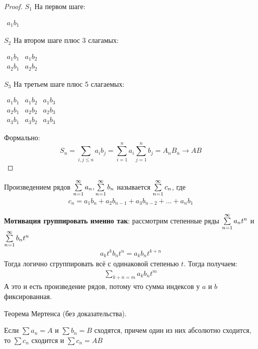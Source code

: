 \begin{proof}
    $S_1$ На первом шаге:
    \begin{center}
        $\begin{matrix}
            a_1b_1
        \end{matrix}$
    \end{center}
    $S_2$ На втором шаге плюс 3 слагамых:
    \begin{center}
        $\begin{matrix}
            a_1b_1 & a_1b_2 \\
            a_2b_1 & a_2b_2
        \end{matrix}$
    \end{center}
    $S_3$ На третьем шаге плюс 5 слагаемых:
    \begin{center}
        $\begin{matrix}
            a_1b_1 & a_1b_2 & a_1b_3 \\
            a_2b_1 & a_2b_2 & a_2b_3 \\
            a_3b_1 & a_3b_2 & a_3b_3
        \end{matrix}$
    \end{center}
    Формально:
    \begin{equation*}
        S_n = \sum_{i,j \leq n} a_ib_j = \sum_{i=1}^n a_i \sum_{j=1}^n b_j
        = A_nB_n \longrightarrow AB
    \end{equation*}

\end{proof}

\begin{conj}
    Произведением рядов $\sum \limits_{n=1}^\infty a_n, \sum \limits_{n=1}^\infty b_n$ называется $\sum \limits_{n=1}^\infty c_n$, где 
    \begin{gather*} 
        c_n = a_1b_n + a_2b_{n-1}+a_3b_{n-2} + \ldots + a_nb_1
    \end{gather*}
\end{conj}

\textbf{Мотивация группировать именно так}: рассмотрим степенные ряды $\sum \limits_{n=1}^\infty a_nt^n$ и $\sum \limits_{n=1}^\infty b_nt^n$
\begin{gather*}
    a_kt^k b_nt^n = a_kb_n t^{k+n}
\end{gather*}
Тогда логично сгруппировать всё с одинаковой степенью $t$. Тогда получаем:
\begin{gather*}
   \sum\limits_{k+n = m}a_kb_n t^m
\end{gather*}
А это и есть произведение рядов, потому что сумма индексов у $a$ и $b$ фиксированная. 

\begin{theorem}
    Теорема Мертенса (без доказательства). 
    
    Если $\sum a_n = A$ и $\sum b_n = B$ сходятся, 
    причем один из них абсолютно сходится, то $\sum c_n$ сходится и $\sum c_n = AB$
\end{theorem}

